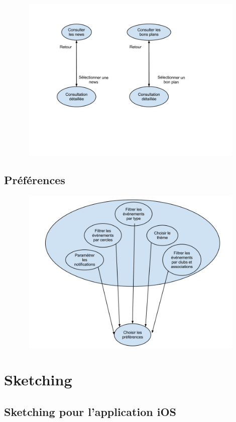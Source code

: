 \documentclass[a4paper, 11px]{article}
\begin{document}
\begin{figure}[h!]
\includegraphics[width=18cm,height=8cm]{IUAnewsbonsplans.png}
\end{figure}

\subsection{Préférences}
\begin{figure}[h!]
\includegraphics[width=18cm,height=8cm]{IUApreferences.png}
\end{figure}
\newpage

\section{Sketching}

\subsection{Sketching pour l'application iOS}
\end{document}
